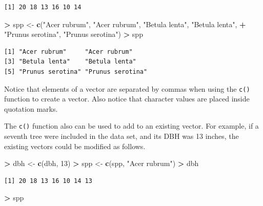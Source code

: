 \documentclass[]{krantz}
\makeatletter
\newenvironment{Shaded}{\begin{snugshade}}{\end{snugshade}}
\newcommand{\DecValTok}[1]{\textcolor[rgb]{0.06,0.06,0.06}{#1}}
\newcommand{\KeywordTok}[1]{\textcolor[rgb]{0.27,0.27,0.27}{\textbf{#1}}}
\newcommand{\NormalTok}[1]{#1}
\newcommand{\OperatorTok}[1]{\textcolor[rgb]{0.43,0.43,0.43}{\textbf{#1}}}
\newcommand{\StringTok}[1]{\textcolor[rgb]{0.5,0.5,0.5}{#1}}
\newenvironment{kframe}{%
\medskip{}
\setlength{\fboxsep}{.8em}
 \def\at@end@of@kframe{}%
 \ifinner\ifhmode%
  \def\at@end@of@kframe{\end{minipage}}%
  \begin{minipage}{\columnwidth}%
 \fi\fi%
 \def\FrameCommand##1{\hskip\@totalleftmargin \hskip-\fboxsep
 \colorbox{shadecolor}{##1}\hskip-\fboxsep
     \hskip-\linewidth \hskip-\@totalleftmargin \hskip\columnwidth}%
 \MakeFramed {\advance\hsize-\width
   \@totalleftmargin\z@ \linewidth\hsize
   \@setminipage}}%
 {\par\unskip\endMakeFramed%
 \at@end@of@kframe}
\renewenvironment{Shaded}{\begin{kframe}}{\end{kframe}}
\makeatother
\begin{document}
\begin{verbatim}
[1] 20 18 13 16 10 14
\end{verbatim}

\begin{Shaded}
\begin{Highlighting}[]
\OperatorTok{>}\StringTok{ }\NormalTok{spp <-}\StringTok{ }\KeywordTok{c}\NormalTok{(}\StringTok{"Acer rubrum"}\NormalTok{, }\StringTok{"Acer rubrum"}\NormalTok{, }\StringTok{"Betula lenta"}\NormalTok{, }\StringTok{"Betula lenta"}\NormalTok{, }
\OperatorTok{+}\StringTok{          "Prunus serotina"}\NormalTok{, }\StringTok{"Prunus serotina"}\NormalTok{)}
\OperatorTok{>}\StringTok{ }\NormalTok{spp}
\end{Highlighting}
\end{Shaded}

\begin{verbatim}
[1] "Acer rubrum"     "Acer rubrum"    
[3] "Betula lenta"    "Betula lenta"   
[5] "Prunus serotina" "Prunus serotina"
\end{verbatim}

Notice that elements of a vector are separated by commas when using the \texttt{c()} function to create a vector. Also notice that character values are placed inside quotation marks.

The \texttt{c()} function also can be used to add to an existing vector. For example, if a seventh tree were included in the data set, and its DBH was 13 inches, the existing vectors could be modified as follows.

\begin{Shaded}
\begin{Highlighting}[]
\OperatorTok{>}\StringTok{ }\NormalTok{dbh <-}\StringTok{ }\KeywordTok{c}\NormalTok{(dbh, }\DecValTok{13}\NormalTok{)}
\OperatorTok{>}\StringTok{ }\NormalTok{spp <-}\StringTok{ }\KeywordTok{c}\NormalTok{(spp, }\StringTok{"Acer rubrum"}\NormalTok{)}
\OperatorTok{>}\StringTok{ }\NormalTok{dbh}
\end{Highlighting}
\end{Shaded}

\begin{verbatim}
[1] 20 18 13 16 10 14 13
\end{verbatim}

\begin{Shaded}
\begin{Highlighting}[]
\OperatorTok{>}\StringTok{ }\NormalTok{spp}
\end{Highlighting}
\end{Shaded}
\end{document}
